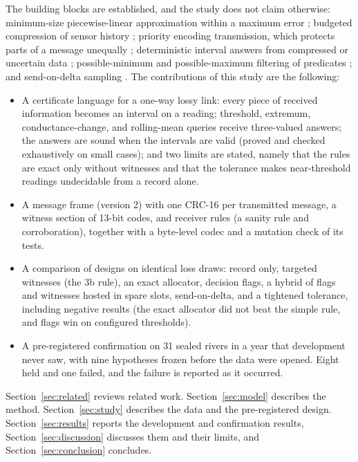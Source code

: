 The building blocks are established, and the study does not claim otherwise: minimum-size piecewise-linear approximation within a maximum error \citep{imai1988,orourke1981}; budgeted compression of sensor history \citep{deligiannakis2007}; priority encoding transmission, which protects parts of a message unequally \citep{albanese1996,boucheron2000pet}; deterministic interval answers from compressed or uncertain data \citep{cheng2003probabilistic,brito2017platodb,lin2019plato}; possible-minimum and possible-maximum filtering of predicates \citep{taurone2024treat}; and send-on-delta sampling \citep{diazcacho2017sod}. The contributions of this study are the following:
\begin{itemize}
  \item A certificate language for a one-way lossy link: every piece of received information becomes an interval on a reading; threshold, extremum, conductance-change, and rolling-mean queries receive three-valued answers; the answers are sound when the intervals are valid (proved and checked exhaustively on small cases); and two limits are stated, namely that the rules are exact only without witnesses and that the tolerance makes near-threshold readings undecidable from a record alone.
  \item A message frame (version 2) with one CRC-16 per transmitted message, a witness section of 13-bit codes, and receiver rules (a sanity rule and corroboration), together with a byte-level codec and a mutation check of its tests.
  \item A comparison of designs on identical loss draws: record only, targeted witnesses (the 3b rule), an exact allocator, decision flags, a hybrid of flags and witnesses hosted in spare slots, send-on-delta, and a tightened tolerance, including negative results (the exact allocator did not beat the simple rule, and flags win on configured thresholds).
  \item A pre-registered confirmation on 31 sealed rivers in a year that development never saw, with nine hypotheses frozen before the data were opened. Eight held and one failed, and the failure is reported as it occurred.
\end{itemize}

Section~\ref{sec:related} reviews related work. Section~\ref{sec:model} describes the method. Section~\ref{sec:study} describes the data and the pre-registered design. Section~\ref{sec:results} reports the development and confirmation results, Section~\ref{sec:discussion} discusses them and their limits, and Section~\ref{sec:conclusion} concludes.
